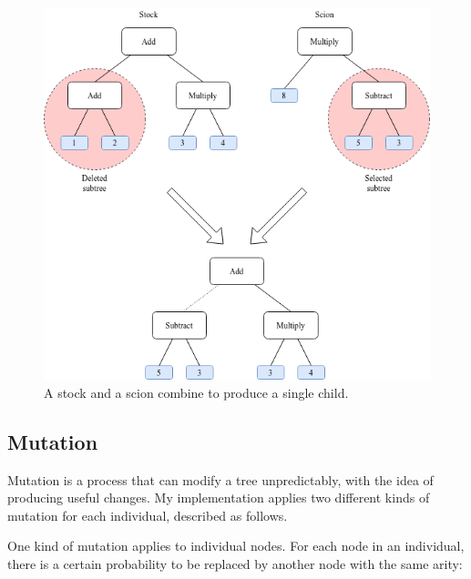 \documentclass{report}
\begin{document}
\begin{figure}[H]
    \centering
    \includegraphics[scale=0.60]{crossover}
    \caption{A stock and a scion combine to produce a single child.}
\end{figure}

\subsection{Mutation}

Mutation is a process that can modify a tree unpredictably, with the idea of producing useful changes. My implementation applies two different kinds of mutation for each individual, described as follows.

One kind of mutation applies to individual nodes. For each node in an individual, there is a certain probability to be replaced by another node with the same arity:
\end{document}

